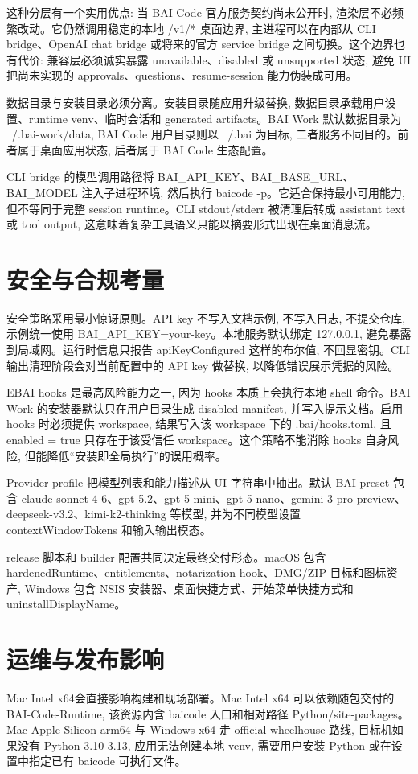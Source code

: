 这种分层有一个实用优点: 当 BAI Code 官方服务契约尚未公开时, 渲染层不必频繁改动。它仍然调用稳定的本地 /v1/* 桌面边界, 主进程可以在内部从 CLI bridge、OpenAI chat bridge 或将来的官方 service bridge 之间切换。这个边界也有代价: 兼容层必须诚实暴露 unavailable、disabled 或 unsupported 状态, 避免 UI 把尚未实现的 approvals、questions、resume-session 能力伪装成可用。

数据目录与安装目录必须分离。安装目录随应用升级替换, 数据目录承载用户设置、runtime venv、临时会话和 generated artifacts。BAI Work 默认数据目录为 ~/.bai-work/data, BAI Code 用户目录则以 ~/.bai 为目标, 二者服务不同目的。前者属于桌面应用状态, 后者属于 BAI Code 生态配置。

CLI bridge 的模型调用路径将 BAI\_API\_KEY、BAI\_BASE\_URL、BAI\_MODEL 注入子进程环境, 然后执行 baicode -p。它适合保持最小可用能力, 但不等同于完整 session runtime。CLI stdout/stderr 被清理后转成 assistant text 或 tool output, 这意味着复杂工具语义只能以摘要形式出现在桌面消息流。

\section{安全与合规考量}
安全策略采用最小惊讶原则。API key 不写入文档示例, 不写入日志, 不提交仓库, 示例统一使用 BAI\_API\_KEY=your-key。本地服务默认绑定 127.0.0.1, 避免暴露到局域网。运行时信息只报告 apiKeyConfigured 这样的布尔值, 不回显密钥。CLI 输出清理阶段会对当前配置中的 API key 做替换, 以降低错误展示凭据的风险。

EBAI hooks 是最高风险能力之一, 因为 hooks 本质上会执行本地 shell 命令。BAI Work 的安装器默认只在用户目录生成 disabled manifest, 并写入提示文档。启用 hooks 时必须提供 workspace, 结果写入该 workspace 下的 .bai/hooks.toml, 且 enabled = true 只存在于该受信任 workspace。这个策略不能消除 hooks 自身风险, 但能降低“安装即全局执行”的误用概率。

Provider profile 把模型列表和能力描述从 UI 字符串中抽出。默认 BAI preset 包含 claude-sonnet-4-6、gpt-5.2、gpt-5-mini、gpt-5-nano、gemini-3-pro-preview、deepseek-v3.2、kimi-k2-thinking 等模型, 并为不同模型设置 contextWindowTokens 和输入输出模态。

release 脚本和 builder 配置共同决定最终交付形态。macOS 包含 hardenedRuntime、entitlements、notarization hook、DMG/ZIP 目标和图标资产, Windows 包含 NSIS 安装器、桌面快捷方式、开始菜单快捷方式和 uninstallDisplayName。

\section{运维与发布影响}
Mac Intel x64会直接影响构建和现场部署。Mac Intel x64 可以依赖随包交付的 BAI-Code-Runtime, 该资源内含 baicode 入口和相对路径 Python/site-packages。Mac Apple Silicon arm64 与 Windows x64 走 official wheelhouse 路线, 目标机如果没有 Python 3.10-3.13, 应用无法创建本地 venv, 需要用户安装 Python 或在设置中指定已有 baicode 可执行文件。

